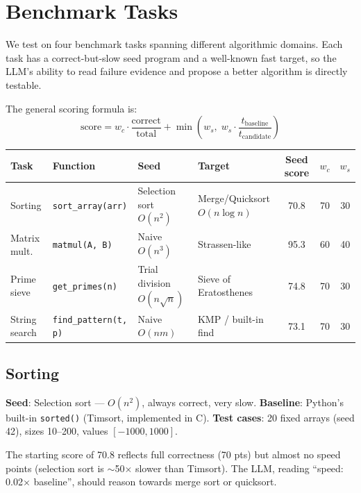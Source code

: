 \documentclass[11pt,a4paper]{article}
\begin{document}
\section{Benchmark Tasks}

We test on four benchmark tasks spanning different algorithmic domains.
Each task has a correct-but-slow seed program and a well-known fast target,
so the LLM's ability to read failure evidence and propose a better algorithm
is directly testable.

The general scoring formula is:
\[
  \text{score} = w_c \cdot \frac{\text{correct}}{\text{total}} + \min\!\left(w_s,\; w_s \cdot \frac{t_{\text{baseline}}}{t_{\text{candidate}}}\right)
\]

\begin{center}
\begin{tabular}{llllccc}
\toprule
\textbf{Task} & \textbf{Function} & \textbf{Seed} & \textbf{Target} & \textbf{Seed score} & $w_c$ & $w_s$ \\
\midrule
Sorting        & \texttt{sort\_array(arr)}     & Selection sort $O(n^2)$      & Merge/Quicksort $O(n\log n)$ & 70.8 & 70 & 30 \\
Matrix mult.   & \texttt{matmul(A, B)}         & Naive $O(n^3)$               & Strassen-like               & 95.3 & 60 & 40 \\
Prime sieve    & \texttt{get\_primes(n)}       & Trial division $O(n\sqrt{n})$ & Sieve of Eratosthenes        & 74.8 & 70 & 30 \\
String search  & \texttt{find\_pattern(t, p)}  & Naive $O(nm)$                & KMP / built-in find         & 73.1 & 70 & 30 \\
\bottomrule
\end{tabular}
\end{center}

\subsection{Sorting}

\textbf{Seed}: Selection sort — $O(n^2)$, always correct, very slow.
\textbf{Baseline}: Python's built-in \texttt{sorted()} (Timsort, implemented in C).
\textbf{Test cases}: 20 fixed arrays (seed 42), sizes 10--200, values $[-1000, 1000]$.

The starting score of 70.8 reflects full correctness (70 pts) but almost no speed
points (selection sort is $\sim$50$\times$ slower than Timsort). The LLM,
reading ``speed: 0.02$\times$ baseline'', should reason towards merge sort or quicksort.
\end{document}
